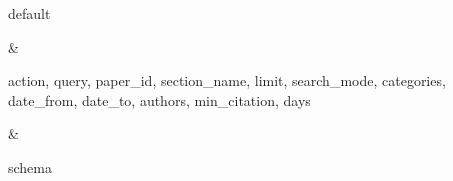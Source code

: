 {\begin{longtable}
\begin{minipage}[t]{\linewidth}
default
\end{minipage} & \begin{minipage}[t]{\linewidth}\RaggedRight\hspace{0pt}
action, query, paper\_\allowbreak{}id, section\_\allowbreak{}name, limit, search\_\allowbreak{}mode, categories, date\_\allowbreak{}from, date\_\allowbreak{}to, authors, min\_\allowbreak{}citation, days
\end{minipage} & \begin{minipage}[t]{\linewidth}\RaggedRight\hspace{0pt}
schema
\end{minipage} \\
\end{longtable}
}
